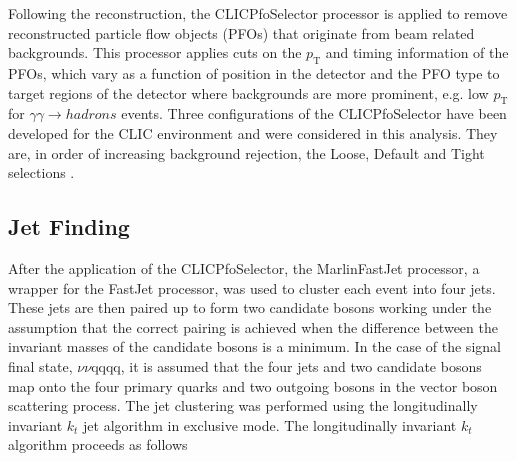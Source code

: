 Following the reconstruction, the CLICPfoSelector processor \cite{arXiv:1209.4039} is applied to remove reconstructed particle flow objects (PFOs) that originate from beam related backgrounds.  This processor applies cuts on the $p_{\text{T}}$ and timing information of the PFOs, which vary as a function of position in the detector and the PFO type to target regions of the detector where backgrounds are more prominent, e.g. low $p_{\text{T}}$ for $\gamma\gamma \rightarrow hadrons$ events.  Three configurations of the CLICPfoSelector  have been developed for the CLIC environment and were considered in this analysis.  They are, in order of increasing background rejection, the Loose, Default and Tight selections \cite{arXiv:1209.4039}. 


\subsection{Jet Finding} 
\label{sec:jetpairing}
After the application of the CLICPfoSelector, the MarlinFastJet processor, a wrapper for the FastJet \cite{Cacciari:2011ma} processor, was used to cluster each event into four jets.  These jets are then paired up to form two candidate bosons working under the assumption that the correct pairing is achieved when the difference between the invariant masses of the candidate bosons is a {minimum}.  In the case of the signal final state, $\nu\nu$qqqq, it is assumed that the four jets and two candidate bosons map onto the four primary quarks and two outgoing bosons in the vector boson scattering process.  The jet clustering was performed using the longitudinally invariant $k_{t}$ jet algorithm \cite{Catani:1993hr, Ellis:1993tq} in exclusive mode.  The longitudinally invariant $k_{t}$ algorithm proceeds as follows

